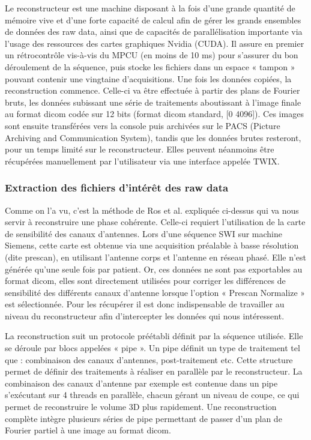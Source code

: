 {Le reconstructeur est une machine disposant à la fois d’une grande quantité de mémoire vive
et d’une forte capacité de calcul afin de gérer les grands ensembles de données des raw data, ainsi que
de capacités de parallélisation importante via l’usage des ressources des cartes graphiques Nvidia
(CUDA). Il assure en premier un rétrocontrôle vis-à-vis du MPCU (en moins de 10 ms) pour s’assurer
du bon déroulement de la séquence, puis stocke les fichiers dans un espace « tampon » pouvant
contenir une vingtaine d’acquisitions. Une fois les données copiées, la reconstruction commence.
Celle-ci va être effectuée à partir des plans de Fourier bruts, les données subissant une série de
traitements aboutissant à l’image finale au format dicom codée sur 12 bits (format dicom standard, [0
4096]). Ces images sont ensuite transférées vers la console puis archivées sur le PACS (Picture Archiving
and Communication System), tandis que les données brutes resteront, pour un temps limité sur le
reconstructeur. Elles peuvent néanmoins être récupérées manuellement par l’utilisateur via une
interface appelée TWIX.
\subsubsection{Extraction des fichiers d’intérêt des raw data}
Comme on l’a vu, c’est la méthode de Ros et al. expliquée ci-dessus qui va nous servir à
reconstruire une phase cohérente. Celle-ci requiert l’utilisation de la carte de sensibilité des canaux
d’antennes. Lors d’une séquence SWI sur machine Siemens, cette carte est obtenue via une acquisition
préalable à basse résolution (dite prescan), en utilisant l’antenne corps et l’antenne en réseau phasé. Elle n’est générée qu’une seule fois par patient. Or, ces données ne sont pas exportables au format
dicom, elles sont directement utilisées pour corriger les différences de sensibilité des différents canaux
d’antenne lorsque l’option « Prescan Normalize » est sélectionnée. Pour les récupérer il est donc
indispensable de travailler au niveau du reconstructeur afin d’intercepter les données qui nous
intéressent.

La reconstruction suit un protocole préétabli définit par la séquence utilisée. Elle se déroule
par blocs appelées « pipe ». Un pipe définit un type de traitement tel que : combinaison des canaux
d’antennes, post-traitement etc. Cette structure permet de définir des traitements à réaliser en
parallèle par le reconstructeur. La combinaison des canaux d’antenne par exemple est contenue dans
un pipe s’exécutant sur 4 threads en parallèle, chacun gérant un niveau de coupe, ce qui permet de
reconstruire le volume 3D plus rapidement. Une reconstruction complète intègre plusieurs séries de
pipe permettant de passer d’un plan de Fourier partiel à une image au format dicom.

}
